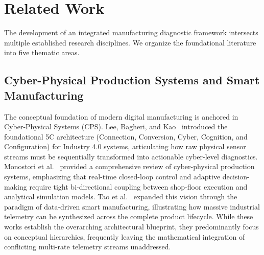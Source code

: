 \documentclass[journal]{IEEEtran}
\begin{document}
\section{Related Work}
\label{sec:related_work}
The development of an integrated manufacturing diagnostic framework intersects multiple established research disciplines. We organize the foundational literature into five thematic areas.

\subsection{Cyber-Physical Production Systems and Smart Manufacturing}
The conceptual foundation of modern digital manufacturing is anchored in Cyber-Physical Systems (CPS). Lee, Bagheri, and Kao~\cite{Lee2015} introduced the foundational 5C architecture (Connection, Conversion, Cyber, Cognition, and Configuration) for Industry 4.0 systems, articulating how raw physical sensor streams must be sequentially transformed into actionable cyber-level diagnostics. Monostori et al.~\cite{Monostori2016} provided a comprehensive review of cyber-physical production systems, emphasizing that real-time closed-loop control and adaptive decision-making require tight bi-directional coupling between shop-floor execution and analytical simulation models. Tao et al.~\cite{Tao2018} expanded this vision through the paradigm of data-driven smart manufacturing, illustrating how massive industrial telemetry can be synthesized across the complete product lifecycle. While these works establish the overarching architectural blueprint, they predominantly focus on conceptual hierarchies, frequently leaving the mathematical integration of conflicting multi-rate telemetry streams unaddressed.
\end{document}
